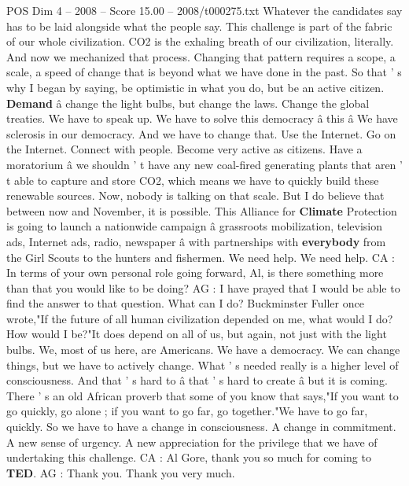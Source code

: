 \begin{textsample}{POS Dim 4 – 2008 – Score 15.00 – 2008/t000275.txt}
Whatever the candidates say has to be laid alongside what the people say.
This challenge is part of the fabric of our whole civilization.
CO2 is the exhaling breath of our civilization, literally.
And now we mechanized that process.
Changing that pattern requires a scope, a scale, a speed of change that is beyond what we have done in the past.
So that ' s why I began by saying, be optimistic in what you do, but be an active citizen. \textbf{Demand} â change the light bulbs, but change the laws.
Change the global treaties.
We have to speak up.
We have to solve this democracy â this â We have sclerosis in our democracy.
And we have to change that.
Use the Internet.
Go on the Internet.
Connect with people.
Become very active as citizens.
Have a moratorium â we shouldn ' t have any new coal-fired generating plants that aren ' t able to capture and store CO2, which means we have to quickly build these renewable sources.
Now, nobody is talking on that scale.
But I do believe that between now and November, it is possible.
This Alliance for \textbf{Climate} Protection is going to launch a nationwide campaign â grassroots mobilization, television ads, Internet ads, radio, newspaper â with partnerships with \textbf{everybody} from the Girl Scouts to the hunters and fishermen.
We need help.
We need help.
CA : In terms of your own personal role going forward, Al, is there something more than that you would like to be doing?
AG : I have prayed that I would be able to find the answer to that question.
What can I do?
Buckminster Fuller once wrote,"If the future of all human civilization depended on me, what would I do?
How would I be?"It does depend on all of us, but again, not just with the light bulbs.
We, most of us here, are Americans.
We have a democracy.
We can change things, but we have to actively change.
What ' s needed really is a higher level of consciousness.
And that ' s hard to â that ' s hard to create â but it is coming.
There ' s an old African proverb that some of you know that says,"If you want to go quickly, go alone ; if you want to go far, go together."We have to go far, quickly.
So we have to have a change in consciousness.
A change in commitment.
A new sense of urgency.
A new appreciation for the privilege that we have of undertaking this challenge.
CA : Al Gore, thank you so much for coming to \textbf{TED}.
AG : Thank you.
Thank you very much.

\end{textsample}
